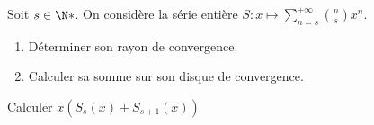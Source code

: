 \begin{enonce}
\begin{exercise}[ID={RMS126 E868},subtitle={CCP MP 2015},tags={}]
Soit $s\in\N*$.
On considère la série entière $S:x\mapsto \sum_{n=s}^{+\infty} \binom ns x^n$.
\begin{enumerate}
  \item Déterminer son rayon de convergence.
  \item Calculer sa somme sur son disque de convergence.
\end{enumerate}
\end{exercise}
\begin{solution}
Calculer $x(S_s(x) + S_{s+1}(x))$
\end{solution}
\end{enonce}
